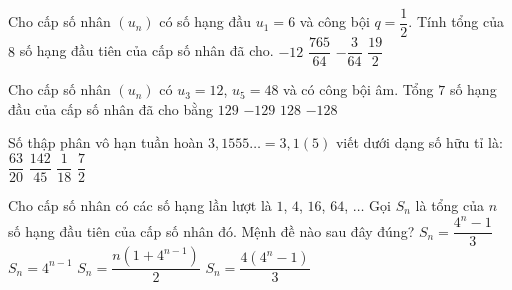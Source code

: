 \begin{ex}%
	Cho cấp số nhân $\left( u_n\right)$ có  số hạng đầu $u_1=6$ và công bội $q=\dfrac{1}{2}$. Tính tổng của $8$ số hạng đầu tiên của cấp số nhân đã cho.
	\choice 
		 { $-12$}
		{  \True $\dfrac{765}{64}$}
		 { $- \dfrac{3}{64}$}
		 { $\dfrac{19}{2}$}
\end{ex}

\begin{ex}%
	Cho cấp số nhân $\left(u_n\right)$ có $u_3 = 12$, $u_5 = 48$ và có công bội âm.  Tổng $7$ số hạng đầu của cấp số nhân đã cho bằng
	\choice 
		{\True $129$} 
		{$-129$} 
		{$128$} 
		{$-128$} 
\end{ex}

\begin{ex}%
	Số thập phân vô hạn tuần hoàn  $3{,}1555\ldots = 3{,}1(5)$ viết dưới dạng số hữu tỉ là:
	 \choice
		{$\dfrac{63}{20}$} 
		{\True  $\dfrac{142}{45}$}
		 {$\dfrac{1}{18}$}
		 {$\dfrac{7}{2}$}
\end{ex}

\begin{ex}%
	Cho cấp số nhân có các số hạng lần lượt là $1$, $4$, $16$, $64$, $\ldots$ Gọi $S_n$ là tổng của  $n$ số hạng đầu tiên của cấp số nhân đó. Mệnh đề nào sau đây đúng?
	 \choice
		{\True  $S_n = \dfrac{4^n - 1}{3}$}
		{$S_n = 4^{n -  1}$}
		{$S_n = \dfrac{n\left(1 +  4^{n - 1}\right)}{2}$}
		{$S_n = \dfrac{4\left(4^n  - 1\right)}{3}$}
\end{ex}

